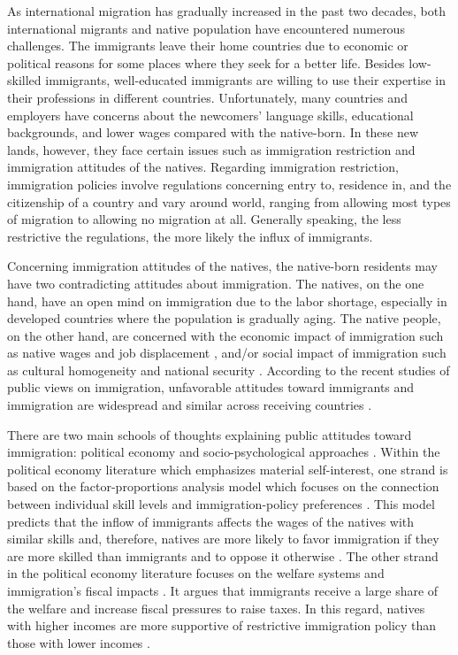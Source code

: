 \documentclass[12pt]{article}
\begin{document}
As international migration has gradually increased in the past two decades, both international migrants and native population have encountered numerous challenges. The immigrants leave their home countries due to economic or political reasons for some places where they seek for a better life. Besides low-skilled immigrants, well-educated immigrants are willing to use their expertise in their professions in different countries. Unfortunately, many countries and employers have concerns about the newcomers' language skills, educational backgrounds, and lower wages compared with the native-born. In these new lands, however, they face certain issues such as immigration restriction and immigration attitudes of the natives. Regarding immigration restriction, immigration policies involve regulations concerning entry to, residence in, and the citizenship of a country and vary around world, ranging from allowing most types of migration to allowing no migration at all. Generally speaking, the less restrictive the regulations, the more likely the influx of immigrants. 


Concerning immigration attitudes of the natives, the native-born residents may have two contradicting attitudes about immigration. The natives, on the one hand, have an open mind on immigration due to the labor shortage, especially in developed countries where the population is gradually aging. The native people, on the other hand, are concerned with the economic impact of immigration such as native wages and job displacement \citep{ScheveSlaughter2001}, and/or social impact of immigration such as cultural homogeneity \citep{Cardetal2012, CitrinSides2008} and national security \citep{LahavCourtemanche2012}. According to the recent studies of public views on immigration, unfavorable attitudes toward immigrants and immigration are widespread and similar across receiving countries \citep{CitrinSides2008, Zicketal2008}.


There are two main schools of thoughts explaining public attitudes toward immigration: political economy and socio-psychological approaches \citep{DustmannPreston2007, HainmuellerHopkins2014}. Within the political economy literature which emphasizes material self-interest, one strand is based on the factor-proportions analysis model which focuses on the connection between individual skill levels and immigration-policy preferences \citep{ScheveSlaughter2001}. This model predicts that the inflow of immigrants affects the wages of the natives with similar skills and, therefore, natives are more likely to favor immigration if they are more skilled than immigrants and to oppose it otherwise \citep{HainmuellerHiscox2007, Mayda2006}. The other strand in the political economy literature focuses on the welfare systems and immigration's fiscal impacts \citep{Borjas1999}. It argues that immigrants receive a large share of the welfare and increase fiscal pressures to raise taxes. In this regard, natives with higher incomes are more supportive of restrictive immigration policy than those with lower incomes \citep{DustmannPreston2006}.
\end{document}
